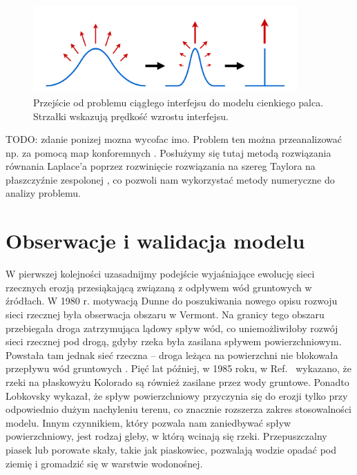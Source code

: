 \documentclass[]{pracamgr}
\begin{document}
      \begin{figure}[h]
        \centering
        \includegraphics[width=0.9\textwidth]{figs/continuous_to_thin.png}
        \caption {Przejście od problemu ciągłego interfejsu do modelu cienkiego palca. Strzałki wskazują prędkość wzrostu interfejsu.}
        \label{continuous_to_thin}
      \end{figure}

      TODO: zdanie ponizej mozna wycofac imo.
      Problem ten można przeanalizować np. za pomocą map konforemnych \cite{loewner1923untersuchungen, gubiec2008fingered}. Posłużymy się tutaj metodą rozwiązania równania Laplace'a poprzez rozwinięcie rozwiązania na szereg Taylora na płaszczyźnie zespolonej \cite{petroff2013bifurcation}, co pozwoli nam wykorzystać metody numeryczne do analizy problemu.


    \section{Obserwacje i walidacja modelu}\label{chapter:validation}

      W pierwszej kolejności uzasadnijmy podejście wyjaśniające ewolucję sieci rzecznych erozją przesiąkającą związaną z odpływem wód gruntowych w źródłach. W 1980 r. motywacją Dunne do poszukiwania nowego opisu rozwoju sieci rzecznej była obserwacja obszaru w Vermont. Na granicy tego obszaru przebiegała droga zatrzymująca lądowy spływ wód, co uniemożliwiłoby rozwój sieci rzecznej pod drogą, gdyby rzeka była zasilana spływem powierzchniowym. Powstała tam jednak sieć rzeczna -- droga leżąca na powierzchni nie blokowała przepływu wód gruntowych \cite{dunne1980formation}. Pięć lat później, w 1985 roku, w Ref.~\cite{laity1985sapping} wykazano, że rzeki na płaskowyżu Kolorado są również zasilane przez wody gruntowe. Ponadto Lobkovsky \cite{lobkovsky2004threshold} wykazał, że spływ powierzchniowy przyczynia się do erozji tylko przy odpowiednio dużym nachyleniu terenu, co znacznie rozszerza zakres stosowalności modelu. Innym czynnikiem, który pozwala nam zaniedbywać spływ powierzchniowy, jest rodzaj gleby, w którą wcinają się rzeki. Przepuszczalny piasek lub porowate skały, takie jak piaskowiec, pozwalają wodzie opadać pod ziemię i gromadzić się w warstwie wodonośnej.
\end{document}
